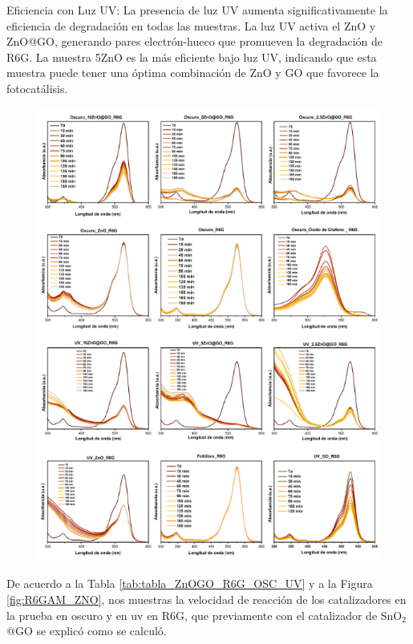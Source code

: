 \documentclass[12pt]{article}
\begin{document}
Eficiencia con Luz UV:
La presencia de luz UV aumenta significativamente la eficiencia de degradación en todas las muestras. La luz UV activa el ZnO y ZnO@GO, generando pares electrón-hueco que promueven la degradación de R6G.
La muestra 5ZnO es la más eficiente bajo luz UV, indicando que esta muestra puede tener una óptima combinación de ZnO y GO que favorece la fotocatálisis.
\begin{figure}[H]
    	   \begin{center}
     	  	\includegraphics[width = 1\textwidth]{Imagenes/R6G_ZnO_UV_Osc.png}
    	   \end{center} 
        \end{figure}

De acuerdo a la Tabla \ref{tab:tabla_ZnOGO_R6G_OSC_UV} y a la Figura \ref{fig:R6GAM_ZNO}, nos muestras la velocidad de reacción de los catalizadores en la prueba en oscuro y en uv en R6G, que previamente con el catalizador de SnO$\displaystyle _{2}$@GO se explicó como se calculó.
\end{document}
